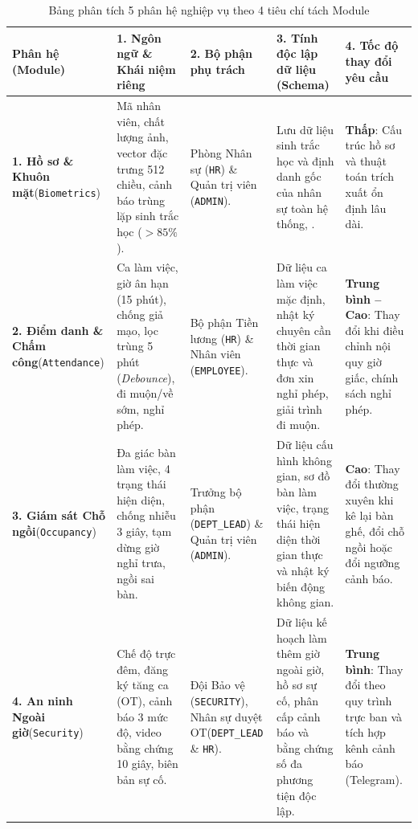 \documentclass[12pt,a4paper]{article}
\begin{document}
\begin{longtable}{|L{\tabcolsep\relax}|L{\tabcolsep\relax}|L{\tabcolsep\relax}|L{\tabcolsep\relax}|L{\tabcolsep\relax}|}
\caption{Bảng phân tích 5 phân hệ nghiệp vụ theo 4 tiêu chí tách Module}\\
\hline
{}
\textbf{Phân hệ (Module)} & \textbf{1. Ngôn ngữ \& Khái niệm riêng} & \textbf{2. Bộ phận phụ trách} & \textbf{3. Tính độc lập dữ liệu (Schema)} & \textbf{4. Tốc độ thay đổi yêu cầu} \\
\hline
\textbf{1. Hồ sơ \& Khuôn mặt}\newline (\texttt{Biometrics}) & Mã nhân viên, chất lượng ảnh, vector đặc trưng 512 chiều, cảnh báo trùng lặp sinh trắc học ($>85\%$). & Phòng Nhân sự (\texttt{HR}) \& Quản trị viên (\texttt{ADMIN}). & Lưu dữ liệu sinh trắc học và định danh gốc của nhân sự toàn hệ thống, . & \textbf{Thấp}: Cấu trúc hồ sơ và thuật toán trích xuất ổn định lâu dài. \\
\hline
{}
\textbf{2. Điểm danh \& Chấm công}\newline (\texttt{Attendance}) & Ca làm việc, giờ ân hạn (15 phút), chống giả mạo, lọc trùng 5 phút (\textit{Debounce}), đi muộn/về sớm, nghỉ phép. & Bộ phận Tiền lương (\texttt{HR}) \& Nhân viên (\texttt{EMPLOYEE}). & Dữ liệu ca làm việc mặc định, nhật ký chuyên cần thời gian thực và đơn xin nghỉ phép, giải trình đi muộn. & \textbf{Trung bình -- Cao}: Thay đổi khi điều chỉnh nội quy giờ giấc, chính sách nghỉ phép. \\
\hline
\textbf{3. Giám sát Chỗ ngồi}\newline (\texttt{Occupancy}) & Đa giác bàn làm việc, 4 trạng thái hiện diện, chống nhiễu 3 giây, tạm dừng giờ nghỉ trưa, ngồi sai bàn. & Trưởng bộ phận (\texttt{DEPT\_LEAD}) \& Quản trị viên (\texttt{ADMIN}). & Dữ liệu cấu hình không gian, sơ đồ bàn làm việc, trạng thái hiện diện thời gian thực và nhật ký biến động không gian. & \textbf{Cao}: Thay đổi thường xuyên khi kê lại bàn ghế, đổi chỗ ngồi hoặc đổi ngưỡng cảnh báo. \\
\hline
{}
\textbf{4. An ninh Ngoài giờ}\newline (\texttt{Security}) & Chế độ trực đêm, đăng ký tăng ca (OT), cảnh báo 3 mức độ, video bằng chứng 10 giây, biên bản sự cố. & Đội Bảo vệ (\texttt{SECURITY}), Nhân sự duyệt OT(\texttt{DEPT\_LEAD} \& \texttt{HR}). & Dữ liệu kế hoạch làm thêm giờ ngoài giờ, hồ sơ sự cố, phân cấp cảnh báo và bằng chứng số đa phương tiện độc lập. & \textbf{Trung bình}: Thay đổi theo quy trình trực ban và tích hợp kênh cảnh báo (Telegram). \\

\end{longtable}
\end{document}
